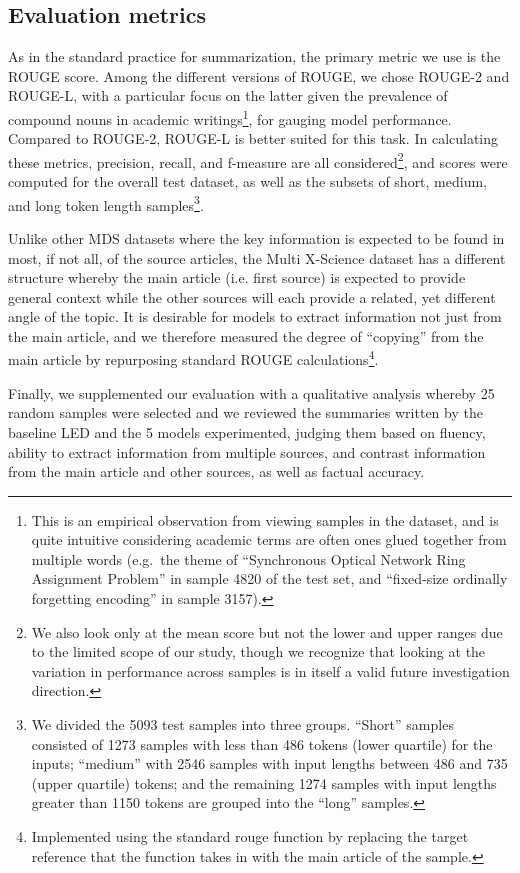 \documentclass[12pt, twocolumn]{article}
\numberwithin{equation}{section}
\begin{document}
\subsection{Evaluation metrics}
\label{ssec:eval-metrics}

As in the standard practice for summarization, the primary metric we use is the ROUGE score.  Among the different versions of ROUGE, we chose ROUGE-2 and ROUGE-L, with a particular focus on the latter given the prevalence of compound nouns in academic writings\footnote{This is an empirical observation from viewing samples in the dataset, and is quite intuitive considering academic terms are often ones glued together from multiple words (e.g.~the theme of ``Synchronous Optical Network Ring Assignment Problem'' in sample 4820 of the test set, and ``fixed-size ordinally forgetting encoding'' in sample 3157).}, for gauging model performance.  Compared to ROUGE-2, ROUGE-L is better suited for this task.  In calculating these metrics, precision, recall, and f-measure are all considered\footnote{We also look only at the mean score but not the lower and upper ranges due to the limited scope of our study, though we recognize that looking at the variation in performance across samples is in itself a valid future investigation direction.}, and scores were computed for the overall test dataset, as well as the subsets of short, medium, and long token length samples\footnote{We divided the 5093 test samples into three groups.  ``Short'' samples consisted of 1273 samples with less than 486 tokens (lower quartile) for the inputs; ``medium'' with 2546 samples with input lengths between 486 and 735 (upper quartile) tokens; and the remaining 1274 samples with input lengths greater than 1150 tokens are grouped into the ``long'' samples.}.  

Unlike other MDS datasets where the key information is expected to be found in most, if not all, of the source articles, the Multi X-Science dataset has a different structure whereby the main article (i.e. first source) is expected to provide general context while the other sources will each provide a related, yet different angle of the topic.  It is desirable for models to extract information not just from the main article, and we therefore measured the degree of ``copying'' from the main article by repurposing standard ROUGE calculations\footnote{Implemented using the standard rouge function by replacing the target reference that the function takes in with the main article of the sample.}.

Finally, we supplemented our evaluation with a qualitative analysis whereby 25 random samples were selected and we reviewed the summaries written by the baseline LED and the 5 models experimented, judging them based on fluency, ability to extract information from multiple sources, and contrast information from the main article and other sources, as well as factual accuracy.
\end{document}
